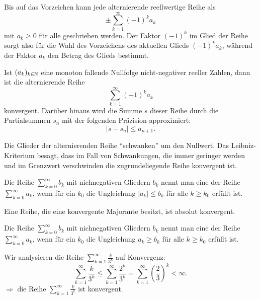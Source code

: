 \begin{bem}
	Bis auf das Vorzeichen kann jede alternierende reellwertige Reihe als 
	\[
		\pm \sum_{k=1}^\infty (-1)^k a_k
	\] mit $a_k \ge 0$ für alle geschrieben werden. Der Faktor $(-1)^k$ im Glied der Reihe sorgt also für die Wahl des Vorzeichens des aktuellen Glieds $(-1)^k a_k$, während der Faktor $a_k$ den Betrag des Glieds bestimmt. 
\end{bem} 

\begin{thm} 
	Ist $(a_k)_{k \in \mathbb{N}}$ eine monoton fallende Nullfolge nicht-negativer reeller Zahlen, dann ist die alternierende Reihe 
	\[
		\sum_{k=1}^\infty (-1)^k a_k
	\]
	konvergent. Darüber hinaus wird die Summe $s$ dieser Reihe durch die Partialsummen $s_n$ mit der folgenden Präzision approximiert: 
	\[
		|s - s_n | \le a_{n+1}. 
	\]
\end{thm} 

\begin{bem} 
	Die Glieder der alternierenden Reihe ``schwanken'' um den Nullwert. Das Leibniz-Kriterium besagt, dass im Fall von Schwankungen, die immer geringer werden und im Grenzwert verschwinden die zugrundeliegende Reihe konvergent ist. 
\end{bem} 


\begin{defn}
	Die Reihe $\sum_{k=0}^\infty b_k$ mit nichnegativen Gliedern $b_k$ nennt man eine  der Reihe $\sum_{k=0}^\infty a_k$, wenn für ein $k_0$ die Ungleichung $|a_k| \le b_k$ für alle $k \ge k_0$ erfüllt ist. 
\end{defn} 

\begin{thm}[Majorantenkriterium] 
	Eine Reihe, die eine konvergente Majorante besitzt, ist absolut konvergent. 
\end{thm} 

\begin{defn}
	Die Reihe $\sum_{k=0}^\infty b_k$ mit nichnegativen Gliedern $b_k$ nennt man eine  der Reihe $\sum_{k=0}^\infty a_k$, wenn für ein $k_0$ die Ungleichung $a_k \ge b_k$ für alle $k \ge k_0$ erfüllt ist. 
\end{defn} 

\begin{bsp}
	Wir analysieren die Reihe $\sum_{k=1}^\infty \frac{k}{3^k}$ auf Konvergenz: 
	\[
		\sum_{k=1}^\infty \frac{k}{3^k}\le \sum_{k=1}^\infty \frac{2^k}{3^k} = \sum_{k=1}^\infty \left( \frac{2}{3} \right)^k < \infty. 
	\]
	$\Rightarrow$ die Reihe $\sum_{k=1}^\infty \frac{k}{3^k}$ ist konvergent. 
\end{bsp} 

